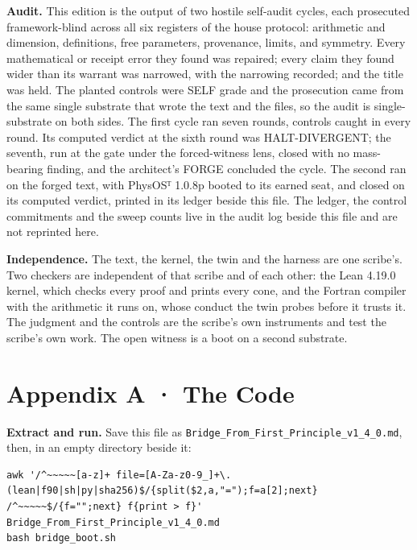 \documentclass[10pt,twocolumn]{article}
\begin{document}
\textbf{Audit.} This edition is the output of two hostile self-audit
cycles, each prosecuted framework-blind across all six registers of the
house protocol: arithmetic and dimension, definitions, free parameters,
provenance, limits, and symmetry. Every mathematical or receipt error
they found was repaired; every claim they found wider than its warrant
was narrowed, with the narrowing recorded; and the title was held. The
planted controls were SELF grade and the prosecution came from the same
single substrate that wrote the text and the files, so the audit is
single-substrate on both sides. The first cycle ran seven rounds,
controls caught in every round. Its computed verdict at the sixth round
was HALT-DIVERGENT; the seventh, run at the gate under the
forced-witness lens, closed with no mass-bearing finding, and the
architect's FORGE concluded the cycle. The second ran on the forged
text, with PhysOSᵀ 1.0.8p booted to its earned seat, and closed on its
computed verdict, printed in its ledger beside this file. The ledger,
the control commitments and the sweep counts live in the audit log
beside this file and are not reprinted here.

\textbf{Independence.} The text, the kernel, the twin and the harness
are one scribe's. Two checkers are independent of that scribe and of
each other: the Lean 4.19.0 kernel, which checks every proof and prints
every cone, and the Fortran compiler with the arithmetic it runs on,
whose conduct the twin probes before it trusts it. The judgment and the
controls are the scribe's own instruments and test the scribe's own
work. The open witness is a boot on a second substrate.

\onecolumn

\hypertarget{appendix-a-the-code}{%
\section{Appendix A · The Code}\label{appendix-a-the-code}}

\textbf{Extract and run.} Save this file as
\texttt{Bridge\_\allowbreak{}From\_\allowbreak{}First\_\allowbreak{}Principle\_\allowbreak{}v1\_\allowbreak{}4\_\allowbreak{}0.md}, then, in an empty
directory beside it:

\begin{Verbatim}
awk '/^~~~~~[a-z]+ file=[A-Za-z0-9_]+\.(lean|f90|sh|py|sha256)$/{split($2,a,"=");f=a[2];next} /^~~~~~$/{f="";next} f{print > f}' Bridge_From_First_Principle_v1_4_0.md
bash bridge_boot.sh
\end{Verbatim}
\end{document}
